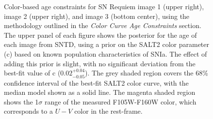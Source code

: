 \documentclass[12pt,dvipsnames]{article}
\def\SNABC{SN Requiem\xspace}
\begin{document}
\begin{figure}
    \caption{Color-based age constraints for \SNABC image 1 (upper right), image 2 (upper right), and image 3 (bottom center), using the methodology outlined in the \textit{Color Curve Age Constraints} section. The upper panel of each figure shows the posterior for the age of each image from SNTD, using a prior on the SALT2 color parameter (c) based on known population characteristics of SNIa. The effect of adding this prior is slight, with no significant deviation from the best-fit value of c ($0.02^{+0.04}_{-0.05}$). The grey shaded region covers the 68\% confidence interval of the best-fit SALT2 color curve, with the median model shown as a solid line. The magenta shaded region shows the 1$\sigma$ range of the measured F105W-F160W color, which corresponds to a $U-V$ color in the rest-frame.}
    \label{fig:colorcurves}
\end{figure}
\end{document}
